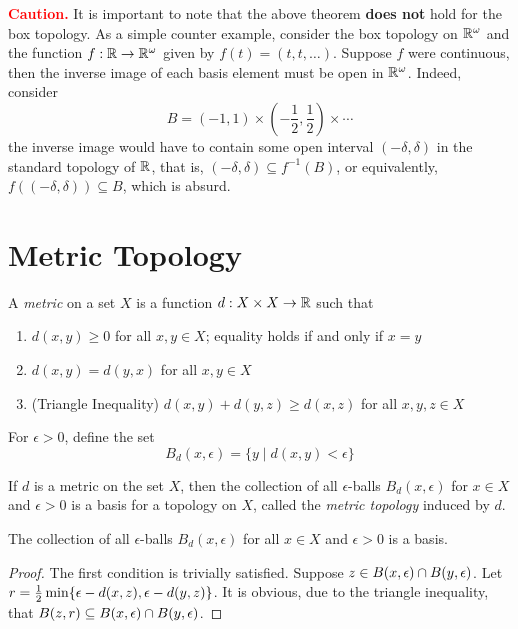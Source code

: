 \begin{mdframed}
    \textbf{\textcolor{red}{Caution.}} It is important to note that the above theorem \textbf{does not} hold for the box topology. As a simple counter example, consider the box topology on $\mathbb{R}^\omega$ and the function $f:\mathbb{R}\to\mathbb{R}^\omega$ given by $f(t)=(t,t,\ldots)$. Suppose $f$ were continuous, then the inverse image of each basis element must be open in $\mathbb{R}^\omega$. Indeed, consider 
    \begin{equation*}
        B = (-1,1)\times(-\frac{1}{2},\frac{1}{2})\times\cdots
    \end{equation*}
    the inverse image would have to contain some open interval $(-\delta,\delta)$ in the standard topology of $\mathbb{R}$, that is, $(-\delta,\delta)\subseteq f^{-1}(B)$, or equivalently, $f((-\delta,\delta))\subseteq B$, which is absurd.
\end{mdframed}

\section{Metric Topology}
\begin{definition}[Metric]
    A \textit{metric} on a set $X$ is a function $d:X\times X\to\mathbb{R}$ such that 
    \begin{enumerate}
        \item $d(x,y)\ge0$ for all $x,y\in X$; equality holds if and only if $x = y$
        \item $d(x, y) = d(y, x)$ for all $x,y\in X$ 
        \item (Triangle Inequality) $d(x, y) + d(y, z)\ge d(x, z)$ for all $x,y,z\in X$
    \end{enumerate}
\end{definition}

For $\epsilon > 0$, define the set 
\begin{equation*}
    B_d(x,\epsilon) = \{y\mid d(x,y) < \epsilon\}
\end{equation*}

\begin{definition}
    If $d$ is a metric on the set $X$, then the collection of all $\epsilon$-balls $B_d(x,\epsilon)$ for $x\in X$ and $\epsilon > 0$ is a basis for a topology on $X$, called the \textit{metric topology} induced by $d$.
\end{definition}

\begin{proposition}
    The collection of all $\epsilon$-balls $B_d(x,\epsilon)$ for all $x\in X$ and $\epsilon > 0$ is a basis.
\end{proposition}
\begin{proof}
    The first condition is trivially satisfied. Suppose $z\in B(x,\epsilon)\cap B(y,\epsilon)$. Let $r = \frac{1}{2}\min\{\epsilon - d(x,z), \epsilon - d(y,z)\}$. It is obvious, due to the triangle inequality, that $B(z,r)\subseteq B(x,\epsilon)\cap B(y,\epsilon)$.
\end{proof}

